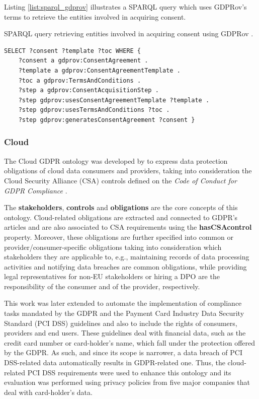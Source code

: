 Listing \ref{list:sparql_gdprov} illustrates a SPARQL query which uses GDPRov's terms to retrieve the entities involved in acquiring consent.

\begin{listing}
\caption{SPARQL query retrieving entities involved in acquiring consent using GDPRov \citep{pandit_modelling_2017}.}
\label{list:sparql_gdprov}
\begin{verbatim}
SELECT ?consent ?template ?toc WHERE {
    ?consent a gdprov:ConsentAgreement .
    ?template a gdprov:ConsentAgreementTemplate .
    ?toc a gdprov:TermsAndConditions .
    ?step a gdprov:ConsentAcquisitionStep .
    ?step gdprov:usesConsentAgreementTemplate ?template .
    ?step gdprov:usesTermsAndConditions ?toc .
    ?step gdprov:generatesConsentAgreement ?consent }
\end{verbatim}
\end{listing}

\subsubsection{Cloud}
\label{sec:cloud}

The Cloud GDPR ontology was developed by \cite{elluri_knowledge_2018} to express data protection obligations of cloud data consumers and providers, taking into consideration the Cloud Security Alliance (CSA) controls defined on the \textit{Code of Conduct for GDPR Compliance} \citep{cloud_security_alliance_-_privacy_level_agreement_working_group_code_2017}.

The \textbf{stakeholders}, \textbf{controls} and \textbf{obligations} are the core concepts of this ontology.
Cloud-related obligations are extracted and connected to GDPR's articles and are also associated to CSA requirements using the \textbf{hasCSAcontrol} property.
Moreover, these obligations are further specified into common or provider/consumer-specific obligations taking into consideration which stakeholders they are applicable to, e.g., maintaining records of data processing activities and notifying data breaches are common obligations, while providing legal representatives for non-EU stakeholders or hiring a DPO are the responsibility of the consumer and of the provider, respectively.

This work was later extended \citep{elluri_integrated_2018} to automate the implementation of compliance tasks mandated by the GDPR and the Payment Card Industry Data Security Standard (PCI DSS) guidelines \citep{pci_security_standards_council_payment_2018} and also to include the rights of consumers, providers and end users.
These guidelines deal with financial data, such as the credit card number or card-holder's name, which fall under the protection offered by the GDPR.
As such, and since its scope is narrower, a data breach of PCI DSS-related data automatically results in GDPR-related one.
Thus, the cloud-related PCI DSS requirements were used to enhance this ontology and its evaluation was performed using privacy policies from five major companies that deal with card-holder's data.

